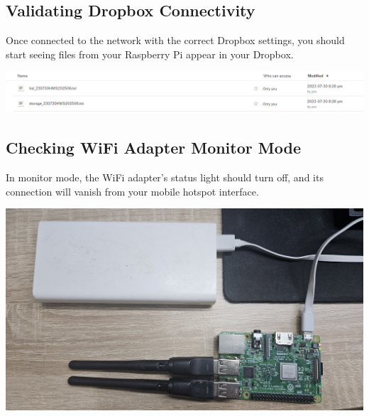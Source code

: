 \documentclass[
  letterpaper,
]{scrbook}
\begin{document}
\subsection{Validating Dropbox
Connectivity}\label{validating-dropbox-connectivity}

Once connected to the network with the correct Dropbox settings, you
should start seeing files from your Raspberry Pi appear in your Dropbox.

\includegraphics{content/material/ch2/check_dropbox_upload.png}

\subsection{Checking WiFi Adapter Monitor
Mode}\label{checking-wifi-adapter-monitor-mode}

In monitor mode, the WiFi adapter's status light should turn off, and
its connection will vanish from your mobile hotspot interface.

\includegraphics{content/material/ch2/plug_external.jpg}
\end{document}
